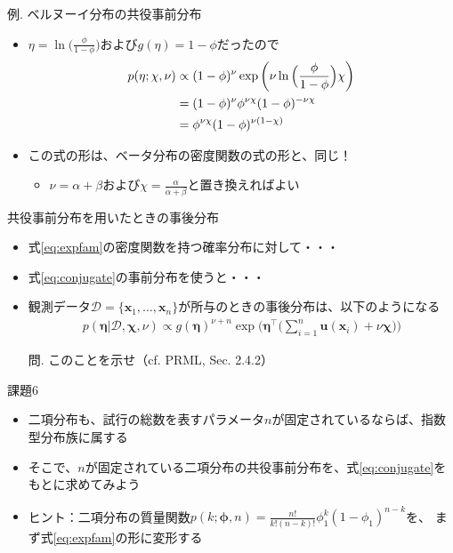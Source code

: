 \documentclass[aspectratio=169,unicode,dvipdfmx,14pt]{beamer}
\begin{document}
\begin{frame}{例. ベルヌーイ分布の共役事前分布}
\begin{itemize}
\item $\eta = \ln \Big( \frac{\phi}{1 - \phi} \Big)$および$g(\eta) = 1 - \phi$だったので
\begin{align}
p(\eta; \chi,\nu) & \propto (1 - \phi)^\nu \exp \bigg(\nu \ln \Big( \frac{\phi}{1 - \phi} \Big) \chi \bigg)
\notag \\ & = (1 - \phi)^\nu \phi^{\nu\chi} (1 - \phi)^{ - \nu\chi}
\notag \\ & = \phi^{\nu\chi} (1 - \phi)^{\nu(1 - \chi)}
\end{align}
\item この式の形は、ベータ分布の密度関数の式の形と、同じ！
\begin{itemize}
\item $\nu = \alpha + \beta$および$\chi = \frac{\alpha}{\alpha + \beta}$と置き換えればよい
\end{itemize}
\end{itemize}
\end{frame}

\begin{frame}{共役事前分布を用いたときの事後分布}
\begin{itemize}
\item 式\eqref{eq:expfam}の密度関数を持つ確率分布に対して・・・
\item 式\eqref{eq:conjugate}の事前分布を使うと・・・
\item 観測データ$\mathcal{D} = \{ \bm{x}_1, \ldots, \bm{x}_n \}$が所与のときの事後分布は、以下のようになる
\begin{align}
p(\bm{\eta}|\mathcal{D},\bm{\chi},\nu) \propto g(\bm{\eta})^{\nu+n}
\exp\bigg( \bm{\eta}^\intercal \bigg( \sum_{i=1}^n \bm{u}(\bm{x}_i) + \nu\bm{\chi} \bigg) \bigg)
\end{align}
\item[問.] このことを示せ（cf. PRML, Sec. 2.4.2）
\end{itemize}
\end{frame}


\begin{frame}{課題6}
\begin{itemize}
\item 二項分布も、試行の総数を表すパラメータ$n$が固定されているならば、指数型分布族に属する
\item そこで、$n$が固定されている二項分布の共役事前分布を、式\eqref{eq:conjugate}をもとに求めてみよう
\item ヒント：二項分布の質量関数$p(k;\bm{\phi},n)=\frac{n!}{k!(n-k)!}\phi_1^k(1-\phi_1)^{n-k}$を、
まず式\eqref{eq:expfam}の形に変形する
\end{itemize}
\end{frame}
\end{document}
